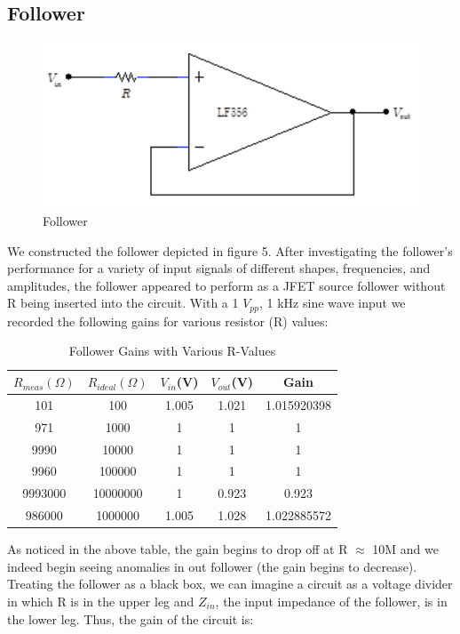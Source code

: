 \documentclass{article}
\begin{document}
\subsection{Follower}
    \begin{figure}[H]
        \centering
        \includegraphics[scale = 0.5]{3.png}
        \caption{Follower ~\cite{webfig}}
        \label{fig:my_label}
    \end{figure}
    We constructed the follower depicted in figure 5. After investigating the follower's performance for a variety of input signals of different shapes, frequencies, and amplitudes, the follower appeared to perform as a JFET source follower without R being inserted into the circuit. With a 1 $V_{pp}$, 1 kHz sine wave input we recorded the following gains for various resistor (R) values:
    \begin{table}[H]
        \centering
        \caption{Follower Gains with Various R-Values}
        \label{my-label}
        \begin{tabular}{ccccc}
        \textbf{$R_{meas}(\Omega)$} & \textbf{$R_{ideal}(\Omega)$} & \textbf{$V_{in}$(V)} & \textbf{$V_{out}$(V)} & \textbf{Gain} \\ \hline
        101 & 100 & 1.005 & 1.021 & 1.015920398 \\
        971 & 1000 & 1 & 1 & 1 \\
        9990 & 10000 & 1 & 1 & 1 \\
        9960 & 100000 & 1 & 1 & 1 \\
        9993000 & 10000000 & 1 & 0.923 & 0.923 \\
        986000 & 1000000 & 1.005 & 1.028 & 1.022885572
        \end{tabular}
    \end{table}
    As noticed in the above table, the gain begins to drop off at R $\approx$ 10M and we indeed begin seeing anomalies in out follower (the gain begins to decrease). Treating the follower as a black box, we can imagine a circuit as a voltage divider in which R is in the upper leg and $Z_{in}$, the input impedance of the follower, is in the lower leg. Thus, the gain of the circuit is:
\end{document}
